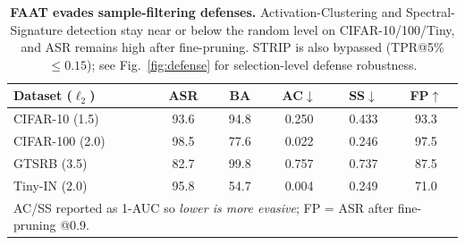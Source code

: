 \begin{table}[t]
\centering
\small
\setlength{\tabcolsep}{4.5pt}
\begin{tabular}{l c c c c c}
\toprule
Dataset ($\ell_2$) & ASR & BA & AC$\downarrow$ & SS$\downarrow$ & FP$\uparrow$ \\
\midrule
CIFAR-10  (1.5)  & 93.6 & 94.8 & 0.250 & 0.433 & 93.3 \\
CIFAR-100 (2.0)  & 98.5 & 77.6 & 0.022 & 0.246 & 97.5 \\
GTSRB     (3.5)  & 82.7 & 99.8 & 0.757 & 0.737 & 87.5 \\
Tiny-IN   (2.0)  & 95.8 & 54.7 & 0.004 & 0.249 & 71.0 \\
\midrule
\multicolumn{6}{l}{\footnotesize AC/SS reported as 1-AUC so \emph{lower is more evasive}; FP = ASR after fine-pruning @0.9.} \\
\bottomrule
\end{tabular}
\caption{\textbf{FAAT evades sample-filtering defenses.} Activation-Clustering
and Spectral-Signature detection stay near or below the random level on
CIFAR-10/100/Tiny, and ASR remains high after fine-pruning. STRIP is also
bypassed (TPR@5\% $\le 0.15$); see Fig.~\ref{fig:defense} for selection-level
defense robustness.}
\label{tab:defense}
\end{table}
